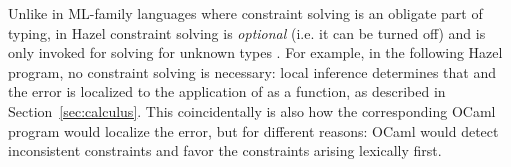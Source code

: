 



Unlike in ML-family languages where constraint solving is an obligate part of typing, in Hazel constraint solving is \emph{optional} (i.e. it can be turned off) and is only invoked for solving for unknown types \cite{outsideIn}. For example, in the following Hazel program, no constraint solving is necessary: local inference determines that  and the error is localized to the application of  as a function, as described in Section~\ref{sec:calculus}. This coincidentally is also how the corresponding OCaml program would localize the error, but for different reasons: OCaml would detect inconsistent constraints and favor the constraints arising lexically first.

